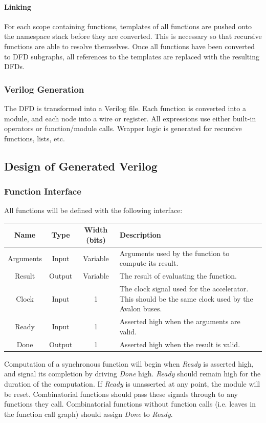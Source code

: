 \documentclass[english,onecolumn]{article}
\begin{document}
\paragraph{Linking}
For each scope containing functions, templates of all functions are pushed onto the namespace stack before they are converted. This is necessary so that recursive functions are able to resolve themselves. Once all functions have been converted to DFD subgraphs, all references to the templates are replaced with the resulting DFDs.

\subsubsection{Verilog Generation}
The DFD is transformed into a Verilog file. Each function is converted into a module, and each node into a wire or register. All expressions use either built-in operators or function/module calls. Wrapper logic is generated for recursive functions, lists, etc.

\subsection{Design of Generated Verilog}
\subsubsection{Function Interface}
\label{s:functionInterface}
All functions will be defined with the following interface:

\begin{tabularx}{\textwidth}{|c|c|c|X|}
\hline 
Name & Type & Width (bits) & Description \\ \hline 
Arguments & Input & Variable & Arguments used by the function to compute its result. \\ \hline 
Result & Output & Variable & The result of evaluating the function. \\ \hline 
Clock & Input & 1 & The clock signal used for the accelerator. This should be the same clock used by the Avalon buses. \\ \hline 
Ready & Input & 1 & Asserted high when the arguments are valid. \\ \hline 
Done & Output & 1 & Asserted high when the result is valid. \\ \hline
\end{tabularx} 

Computation of a synchronous function will begin when \textit{Ready} is asserted high, and signal its completion by driving \textit{Done} high. \textit{Ready} should remain high for the duration of the computation. If \textit{Ready} is unasserted at any point, the module will be reset. Combinatorial functions should pass these signals through to any functions they call. Combinatorial functions without function calls (i.e. leaves in the function call graph) should assign \textit{Done} to \textit{Ready}.
\end{document}
